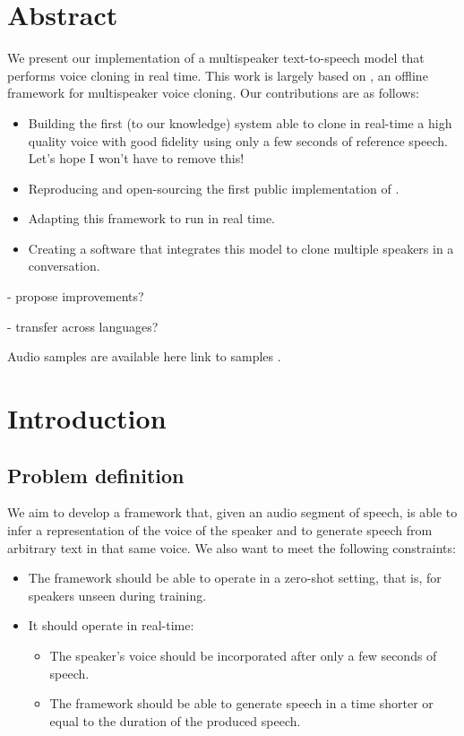\documentclass[a4paper, oneside]{article}
\begin{document}
\section{Abstract}
We present our implementation of a multispeaker text-to-speech model that performs voice cloning in real time. This work is largely based on \citep{SV2TTS}, an offline framework for multispeaker voice cloning. Our contributions are as follows:
\begin{itemize}
	\item Building the first (to our knowledge) system able to clone in real-time a high quality voice with good fidelity using only a few seconds of reference speech. \color{red} Let's hope I won't have to remove this! \color{black}
	\item Reproducing and open-sourcing the first public implementation of \citep{SV2TTS}.
	\item Adapting this framework to run in real time.
	\item Creating a software that integrates this model to clone multiple speakers in a conversation.
\end{itemize}

\color{red}
- propose improvements?

- transfer across languages?
\color{black}

\noindent Audio samples are available here \color{red} link to samples \color{black}.

\section{Introduction}
\subsection{Problem definition}
We aim to develop a framework that, given an audio segment of speech, is able to infer a representation of the voice of the speaker and to generate speech from arbitrary text in that same voice. We also want to meet the following constraints:
\begin{itemize}
	\item The framework should be able to operate in a zero-shot setting, that is, for speakers unseen during training.
	\item It should operate in real-time:
	\begin{itemize}
		\item The speaker's voice should be incorporated after only a few seconds of speech.
		\item The framework should be able to generate speech in a time shorter or equal to the duration of the produced speech.
	\end{itemize}
\end{itemize}
\end{document}
